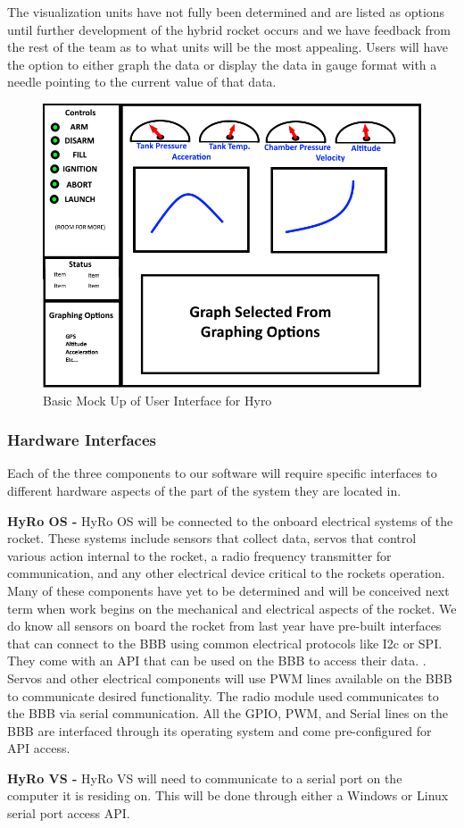 \documentclass[10pt,draftclsnofoot,onecolumn,compsoc]{IEEEtran}
\begin{document}
The visualization units have not fully been determined and are listed as options until further development of the hybrid rocket occurs and we have feedback from the rest of the team as to what units will be the most appealing. Users will have the option to either graph the data or display the data in gauge format with a needle pointing to the current value of that data. \par

\begin{figure}
  \caption{Basic Mock Up of User Interface for Hyro}
  \centering
	\includegraphics[scale=.75]{HyRoUIMockup}
\end{figure}
\FloatBarrier
\subsubsection{Hardware Interfaces}
Each of the three components to our software will require specific interfaces to different hardware aspects of the part of the system they are located in.\par
{\bf HyRo OS -}
 	HyRo OS will be connected to the onboard electrical systems of the rocket. These systems include sensors that collect data, servos that control various action internal to the rocket, a radio frequency transmitter for communication, and any other electrical device critical to the rockets operation. Many of these components have yet to be determined and will be conceived next term when work begins on the mechanical and electrical aspects of the rocket.  We do know all sensors on board the rocket from last year have pre-built interfaces that can connect to the BBB using common electrical protocols like I2c or SPI. They come with an API that can be used on the BBB to access their data. . Servos and other electrical components will use PWM lines available on the BBB to communicate desired functionality. The radio module used communicates to the BBB via serial communication. All the GPIO, PWM, and Serial lines on the BBB are interfaced through its operating system and come pre-configured for API access.\par
{\bf HyRo VS -}
HyRo VS will need to communicate to a serial port on the computer it is residing on.  This will be done through either a Windows or Linux serial port access API.
\end{document}
